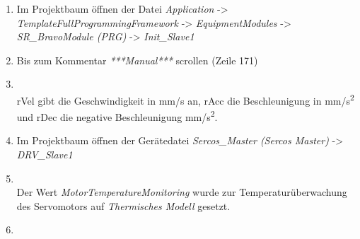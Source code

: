 \documentclass[../../../Bachelorarbeit.tex]{subfiles}
\begin{document}
\begin{enumerate}
    \item Im Projektbaum öffnen der Datei \textit{Application} -> \textit{TemplateFullProgrammingFramework} -> \textit{EquipmentModules} -> \textit{SR\_BravoModule (PRG)} -> \textit{Init\_Slave1}
    \item Bis zum Kommentar \textit{***Manual***} scrollen (Zeile 171)
    \item \begin{minipage}[t]{\linewidth}
        \raggedright
        \label{fig:my-img33}
    \end{minipage}
    \bigskip \\
    rVel gibt die Geschwindigkeit in \si{mm/s} an, rAcc die Beschleunigung in \si{mm/s^2} und rDec die negative Beschleunigung \si{mm/s^2}.
    \item Im Projektbaum öffnen der Gerätedatei \textit{Sercos\_Master (Sercos Master)} -> \\ \textit{DRV\_Slave1}
    \item \begin{minipage}[t]{\linewidth}
        \raggedright
        \label{fig:my-img34}
    \end{minipage}
    \bigskip \\
    Der Wert \textit{MotorTemperatureMonitoring} wurde zur Temperaturüberwachung des Servomotors auf \textit{Thermisches Modell} gesetzt.
    \item \begin{minipage}[t]{\linewidth}

\end{minipage}
\end{enumerate}
\end{document}
